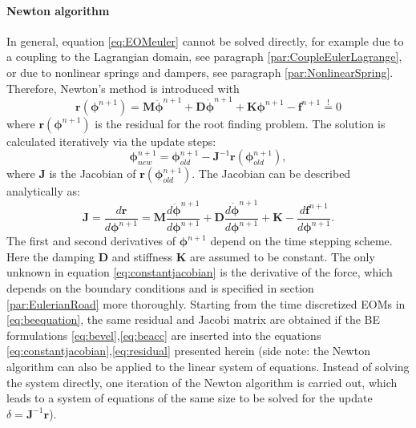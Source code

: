 \paragraph{Newton algorithm}
In general, equation \eqref{eq:EOMeuler} cannot be solved directly, for example due to a coupling to the Lagrangian domain, see paragraph \ref{par:CoupleEulerLagrange}, or due to nonlinear springs and dampers, see paragraph \ref{par:NonlinearSpring}. 
Therefore, Newton's method is introduced with 
\begin{equation}\label{eq:residual}
     \boldsymbol{r}(\boldsymbol{\phi}^{n+1}) = \boldsymbol{M} \ddot{\boldsymbol{\phi}}^{n+1}+ \boldsymbol{D} \dot{\boldsymbol{\phi}}^{n+1} + \boldsymbol{K}\boldsymbol{\phi}^{n+1}-\boldsymbol{f}^{n+1}\overset{!}{=}0
\end{equation}
where $\boldsymbol{r}(\boldsymbol{\phi}^{n+1})$ is the residual for the root finding problem.  
The solution is calculated iteratively via the update steps:
\begin{equation}
\boldsymbol{\phi}^{n+1}_{new} = \boldsymbol{\phi}^{n+1}_{old} - \boldsymbol{J}^{-1}\boldsymbol{r}(\boldsymbol{\phi}^{n+1}_{old}),
\end{equation}
where $\boldsymbol{J}$ is the Jacobian of $\boldsymbol{r}(\boldsymbol{\phi}^{n+1}_{old})$. The Jacobian can be described analytically as:
\begin{equation}
    \label{eq:constantjacobian}
    \boldsymbol{J} = \frac{d\boldsymbol{r}}{d\boldsymbol{\phi}^{n+1}} =  \boldsymbol{M} \frac{d \ddot{\boldsymbol{\phi}}^{n+1}}{d \boldsymbol{\phi}^{n+1}} +  \boldsymbol{D} \frac{d \dot{\boldsymbol{\phi}}^{n+1}}{d \boldsymbol{\phi}^{n+1}} + \boldsymbol{K}  - \frac{d \boldsymbol{f}^{n+1}}{d \boldsymbol{\phi}^{n+1}}.
\end{equation}
The first and second derivatives of $\boldsymbol{\phi}^{n+1}$ depend on the time stepping scheme. Here the damping $\boldsymbol{D}$ and stiffness $\boldsymbol{K}$ are assumed to be constant. The only unknown in equation \eqref{eq:constantjacobian} is the derivative of the force, which depends on the boundary conditions and is specified in section \ref{par:EulerianRoad} more thoroughly.
Starting from the time discretized EOMs in \eqref{eq:beequation}, the same residual and Jacobi matrix are obtained if the BE formulations \eqref{eq:bevel},\eqref{eq:beacc} are inserted into the equations \eqref{eq:constantjacobian},\eqref{eq:residual} presented herein
(side note: the Newton algorithm can also be applied to the linear system of equations. Instead of solving the system directly, one iteration of the Newton algorithm is carried out, which leads to a system of equations of the same size to be solved for the update $\delta = \boldsymbol{J}^{-1}\boldsymbol{r}$).

